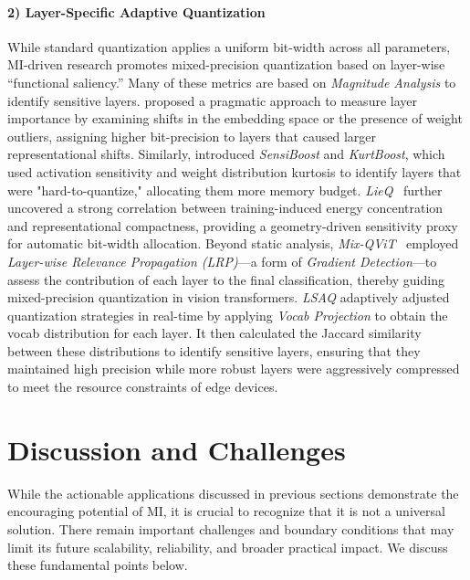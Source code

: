 \documentclass[11pt,letterpaper]{mystyle}
\begin{document}
  \paragraph{2) Layer-Specific Adaptive Quantization}
  While standard quantization applies a uniform bit-width across all parameters, MI-driven research promotes mixed-precision quantization based on layer-wise ``functional saliency.''
  Many of these metrics are based on \textit{Magnitude Analysis} to identify sensitive layers.
  \citet{dumitru2024layer} proposed a pragmatic approach to measure layer importance by examining shifts in the embedding space or the presence of weight outliers, assigning higher bit-precision to layers that caused larger representational shifts.
  Similarly, \citet{zhang2025towards} introduced \textit{SensiBoost} and \textit{KurtBoost}, which used activation sensitivity and weight distribution kurtosis to identify layers that were "hard-to-quantize," allocating them more memory budget.
  \textit{LieQ}~\citep{xiao2025exploring} further uncovered a strong correlation between training-induced energy concentration and representational compactness, providing a geometry-driven sensitivity proxy for automatic bit-width allocation.
  Beyond static analysis, \textit{Mix-QViT}~\citep{ranjan2025mix} employed \textit{Layer-wise Relevance Propagation (LRP)}—a form of \textit{Gradient Detection}—to assess the contribution of each layer to the final classification, thereby guiding mixed-precision quantization in vision transformers.
  \textit{LSAQ} \citep{zeng2024lsaq} adaptively adjusted quantization strategies in real-time by applying \textit{Vocab Projection} to obtain the vocab distribution for each layer.
  It then calculated the Jaccard similarity between these distributions to identify sensitive layers, ensuring that they maintained high precision while more robust layers were aggressively compressed to meet the resource constraints of edge devices.


\newpage

\section{Discussion and Challenges}
\label{app:challenges}
While the actionable applications discussed in previous sections demonstrate the encouraging potential of MI, it is crucial to recognize that it is not a universal solution. There remain important challenges and boundary conditions that may limit its future scalability, reliability, and broader practical impact. We discuss these fundamental points below.
\end{document}
